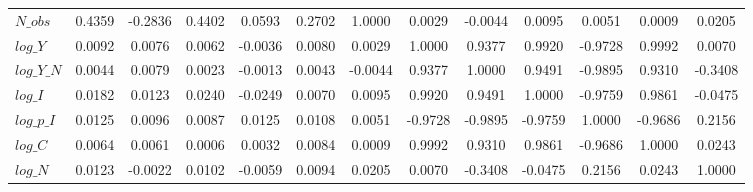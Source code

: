 \begin{center}
\begin{longtable}{lcccccccccccc}
$N\_obs     $	 & 	       0.4359	 & 	      -0.2836	 & 	       0.4402	 & 	       0.0593	 & 	       0.2702	 & 	       1.0000	 & 	       0.0029	 & 	      -0.0044	 & 	       0.0095	 & 	       0.0051	 & 	       0.0009	 & 	       0.0205 \\ 
$log\_Y     $	 & 	       0.0092	 & 	       0.0076	 & 	       0.0062	 & 	      -0.0036	 & 	       0.0080	 & 	       0.0029	 & 	       1.0000	 & 	       0.9377	 & 	       0.9920	 & 	      -0.9728	 & 	       0.9992	 & 	       0.0070 \\ 
$log\_Y\_N  $	 & 	       0.0044	 & 	       0.0079	 & 	       0.0023	 & 	      -0.0013	 & 	       0.0043	 & 	      -0.0044	 & 	       0.9377	 & 	       1.0000	 & 	       0.9491	 & 	      -0.9895	 & 	       0.9310	 & 	      -0.3408 \\ 
$log\_I     $	 & 	       0.0182	 & 	       0.0123	 & 	       0.0240	 & 	      -0.0249	 & 	       0.0070	 & 	       0.0095	 & 	       0.9920	 & 	       0.9491	 & 	       1.0000	 & 	      -0.9759	 & 	       0.9861	 & 	      -0.0475 \\ 
$log\_p\_I  $	 & 	       0.0125	 & 	       0.0096	 & 	       0.0087	 & 	       0.0125	 & 	       0.0108	 & 	       0.0051	 & 	      -0.9728	 & 	      -0.9895	 & 	      -0.9759	 & 	       1.0000	 & 	      -0.9686	 & 	       0.2156 \\ 
$log\_C     $	 & 	       0.0064	 & 	       0.0061	 & 	       0.0006	 & 	       0.0032	 & 	       0.0084	 & 	       0.0009	 & 	       0.9992	 & 	       0.9310	 & 	       0.9861	 & 	      -0.9686	 & 	       1.0000	 & 	       0.0243 \\ 
$log\_N     $	 & 	       0.0123	 & 	      -0.0022	 & 	       0.0102	 & 	      -0.0059	 & 	       0.0094	 & 	       0.0205	 & 	       0.0070	 & 	      -0.3408	 & 	      -0.0475	 & 	       0.2156	 & 	       0.0243	 & 	       1.0000 \\ 
\end{longtable}
 \end{center}

